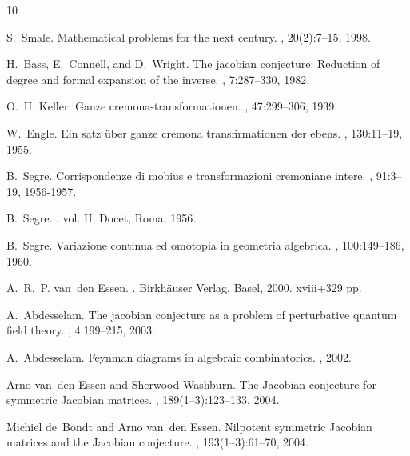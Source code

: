 \documentclass{article}
\newtheorem{main theorem}[defn]{Main Theorem}
\begin{document}

%
\begin{thebibliography}{10}

S.~Smale.
\newblock Mathematical problems for the next century.
, 20(2):7--15, 1998.

H.~Bass, E.~Connell, and D.~Wright.
\newblock The jacobian conjecture: Reduction of degree and formal expansion of
  the inverse.
, 7:287--330,
  1982.

O.~H. Keller.
\newblock Ganze cremona-transformationen.
, 47:299--306, 1939.

W.~Engle.
\newblock Ein satz \"{u}ber ganze cremona transfirmationen der ebens.
, 130:11--19, 1955.

B.~Segre.
\newblock Corrispondenze di mobius e transformazioni cremoniane intere.
, 91:3--19, 1956-1957.

B.~Segre.
.
\newblock vol. II, Docet, Roma, 1956.

B.~Segre.
\newblock Variazione continua ed omotopia in geometria algebrica.
, 100:149--186, 1960.

A.~R.~P. van~den Essen.
.
\newblock Birkh\"{a}user Verlag, Basel, 2000. xviii+329 pp.

A.~Abdesselam.
\newblock The jacobian conjecture as a problem of perturbative quantum field
  theory.
, 4:199--215, 2003.

A.~Abdesselam.
\newblock Feynman diagrams in algebraic combinatorics.
, 2002.

Arno van~den Essen and Sherwood Washburn.
\newblock The {Jacobian} conjecture for symmetric {J}acobian matrices.
, 189(1--3):123--133, 2004.

Michiel de~Bondt and Arno van~den Essen.
\newblock Nilpotent symmetric {J}acobian matrices and the {J}acobian
  conjecture.
, 193(1--3):61--70, 2004.


\end{thebibliography}
\end{document}
